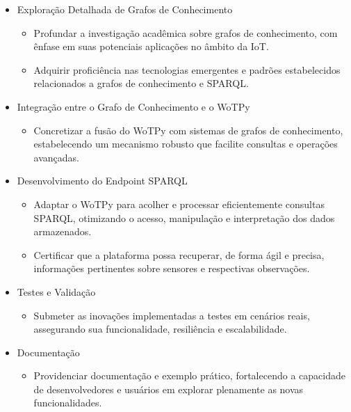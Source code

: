 \begin{itemize}
    \item Exploração Detalhada de Grafos de Conhecimento \label{estudo}
    \begin{itemize}
        \item Profundar a investigação acadêmica sobre grafos de conhecimento, com ênfase em suas potenciais aplicações no âmbito da IoT.
        \item Adquirir proficiência nas tecnologias emergentes e padrões estabelecidos relacionados a grafos de conhecimento e SPARQL.
    \end{itemize}
    \item Integração entre o Grafo de Conhecimento e o WoTPy \label{integração}
    \begin{itemize}
        \item Concretizar a fusão do WoTPy com sistemas de grafos de conhecimento, estabelecendo um mecanismo robusto que facilite consultas e operações avançadas.
    \end{itemize}
    \item Desenvolvimento do Endpoint SPARQL \label{endpoint}
    \begin{itemize}
        \item Adaptar o WoTPy para acolher e processar eficientemente consultas SPARQL, otimizando o acesso, manipulação e interpretação dos dados armazenados.
        \item Certificar que a plataforma possa recuperar, de forma ágil e precisa, informações pertinentes sobre sensores e respectivas observações.
    \end{itemize}
    \item Testes e Validação \label{teste}
    \begin{itemize}
        \item Submeter as inovações implementadas a testes em cenários reais, assegurando sua funcionalidade, resiliência e escalabilidade.
    \end{itemize}
    \item Documentação \label{documentação}
    \begin{itemize}
        \item Providenciar documentação e exemplo prático, fortalecendo a capacidade de desenvolvedores e usuários em explorar plenamente as novas funcionalidades.
    \end{itemize}
\end{itemize}

